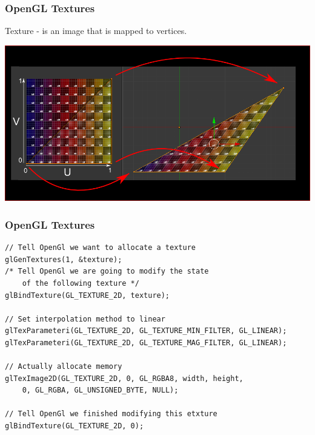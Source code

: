 \begin{frame}[fragile]

\frametitle{OpenGL Textures}

Texture - is an image that is mapped to vertices.

\begin{center}
\includegraphics[width=\textwidth]{images/uv.png}
\end{center}

\end{frame}


\begin{frame}[fragile]

\frametitle{OpenGL Textures}

\begin{lstlisting}[basicstyle=\fontsize{7pt}{8pt}\ttfamily]
// Tell OpenGl we want to allocate a texture
glGenTextures(1, &texture);
/* Tell OpenGl we are going to modify the state
    of the following texture */
glBindTexture(GL_TEXTURE_2D, texture);

// Set interpolation method to linear
glTexParameteri(GL_TEXTURE_2D, GL_TEXTURE_MIN_FILTER, GL_LINEAR);
glTexParameteri(GL_TEXTURE_2D, GL_TEXTURE_MAG_FILTER, GL_LINEAR);

// Actually allocate memory
glTexImage2D(GL_TEXTURE_2D, 0, GL_RGBA8, width, height,
    0, GL_RGBA, GL_UNSIGNED_BYTE, NULL);    

// Tell OpenGl we finished modifying this etxture
glBindTexture(GL_TEXTURE_2D, 0);
\end{lstlisting}


\end{frame}



